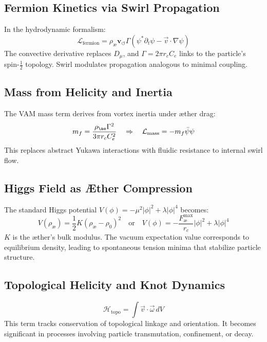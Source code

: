 \documentclass[12pt]{article}
\begin{document}
\subsection{Fermion Kinetics via Swirl Propagation}
In the hydrodynamic formalism:
\begin{equation}
    \mathcal{L}_{\text{fermion}} = \rho_\text{\ae} \mathbf{v}_{\scriptscriptstyle\boldsymbol{\circlearrowleft}} \Gamma \left( \psi^* \partial_t \psi - \vec{v} \cdot \nabla \psi \right)
\end{equation}
The convective derivative replaces $D_\mu$, and $\Gamma = 2\pi r_c C_e$ links to the particle's spin-$\tfrac{1}{2}$ topology. Swirl modulates propagation analogous to minimal coupling.

\subsection{Mass from Helicity and Inertia}
The VAM mass term derives from vortex inertia under \ae{}ther drag:
\begin{equation}
    m_f = \frac{\rho_{\ae} \Gamma^2}{3\pi r_c C_e^2} \quad\Rightarrow\quad \mathcal{L}_{\text{mass}} = -m_f \bar{\psi} \psi
\end{equation}
This replaces abstract Yukawa interactions with fluidic resistance to internal swirl flow.

\subsection{Higgs Field as \AE{}ther Compression}
The standard Higgs potential $V(\phi) = -\mu^2|\phi|^2 + \lambda|\phi|^4$ becomes:
\begin{equation}
    V(\rho_\text{\ae}) = \frac{1}{2}K(\rho_\text{\ae} - \rho_0)^2 \quad\text{or}\quad V(\phi) = -\frac{F^{\text{max}}_{\text{\ae}}}{r_c} |\phi|^2 + \lambda |\phi|^4
\end{equation}
$K$ is the \ae{}ther's bulk modulus. The vacuum expectation value corresponds to equilibrium density, leading to spontaneous tension minima that stabilize particle structure.

\subsection{Topological Helicity and Knot Dynamics}
\begin{equation}
    \mathcal{H}_\text{topo} = \int \vec{v} \cdot \vec{\omega} \, dV
\end{equation}
This term tracks conservation of topological linkage and orientation. It becomes significant in processes involving particle transmutation, confinement, or decay.
\end{document}
